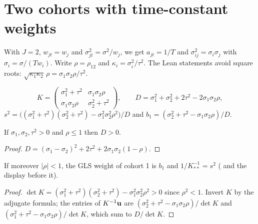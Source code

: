 \chapter{Two cohorts with time-constant weights}\label{ch:two}

With $J = 2$, $w_{jt} = w_j$ and $\sigma_{jt}^2 = \sigma^2/w_j$, we get
$a_{jt} = 1/T$ and $\sigma_{ij}^2 = \sigma_i\sigma_j$ with
$\sigma_i = \sigma/(T w_i)$. Write $\rho = \rho_{12}$ and
$\kappa_i = \sigma_i^2/\tau^2$. The Lean statements avoid square roots:
$\sqrt{\kappa_1\kappa_2}\,\rho = \sigma_1\sigma_2\rho/\tau^2$.

\begin{definition}\label{def:two}
  \leanok
  \[
    K = \begin{pmatrix} \sigma_1^2 + \tau^2 & \sigma_1\sigma_2\rho \\
                        \sigma_1\sigma_2\rho & \sigma_2^2 + \tau^2 \end{pmatrix},
    \qquad D = \sigma_1^2 + \sigma_2^2 + 2\tau^2 - 2\sigma_1\sigma_2\rho,
  \]
  $s^2 = \bigl((\sigma_1^2+\tau^2)(\sigma_2^2+\tau^2) - \sigma_1^2\sigma_2^2\rho^2\bigr)/D$
  and $b_1 = (\sigma_2^2 + \tau^2 - \sigma_1\sigma_2\rho)/D$.
\end{definition}

\begin{lemma}\label{lem:D_pos}
  \leanok
  If $\sigma_1, \sigma_2, \tau^2 > 0$ and $\rho \le 1$ then $D > 0$.
\end{lemma}
\begin{proof}
  \leanok
  $D = (\sigma_1 - \sigma_2)^2 + 2\tau^2 + 2\sigma_1\sigma_2(1 - \rho)$.
\end{proof}

\begin{theorem}\label{thm:gls_two}
  \leanok
  If moreover $|\rho| < 1$, the GLS weight of cohort 1 is $b_1$ and
  $1/K^{-1}_{**} = s^2$ ( and the display before it).
\end{theorem}
\begin{proof}
  \leanok
  $\det K = (\sigma_1^2+\tau^2)(\sigma_2^2+\tau^2) - \sigma_1^2\sigma_2^2\rho^2 > 0$
  since $\rho^2 < 1$. Invert $K$ by the adjugate formula; the entries of
  $K^{-1}\mathbf{u}$ are $(\sigma_2^2+\tau^2-\sigma_1\sigma_2\rho)/\det K$ and
  $(\sigma_1^2+\tau^2-\sigma_1\sigma_2\rho)/\det K$, which sum to
  $D/\det K$.
\end{proof}

